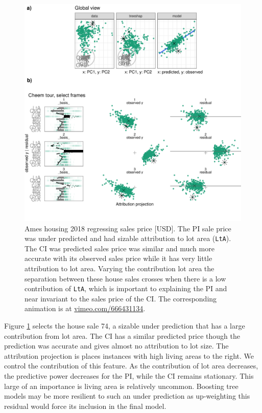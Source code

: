 \documentclass[
]{article}
\begin{document}
\begin{figure}

{\centering \includegraphics[width=1\linewidth]{./figures/case_ames2018} 

}

\caption{Ames housing 2018 regressing sales price {[}USD{]}. The PI sale price was under predicted and had sizable attribution to lot area (\texttt{LtA}). The CI was predicted sales price was similar and much more accurate with its observed sales price while it has very little attribution to lot area. Varying the contribution lot area the separation between these house sales crosses when there is a low contribution of \texttt{LtA}, which is important to explaining the PI and near invariant to the sales price of the CI. The corresponding animation is at \href{https://vimeo.com/666431134}{vimeo.com/666431134}.}\label{fig:caseames}
\end{figure}

Figure \ref{fig:caseames} selects the house sale 74, a sizable under prediction that has a large contribution from lot area. The CI has a similar predicted price though the prediction was accurate and gives almost no attribution to lot size. The attribution projection is places instances with high living areas to the right. We control the contribution of this feature. As the contribution of lot area decreases, the predictive power decreases for the PI, while the CI remains stationary. This large of an importance is living area is relatively uncommon. Boosting tree models may be more resilient to such an under prediction as up-weighting this residual would force its inclusion in the final model.
\end{document}

